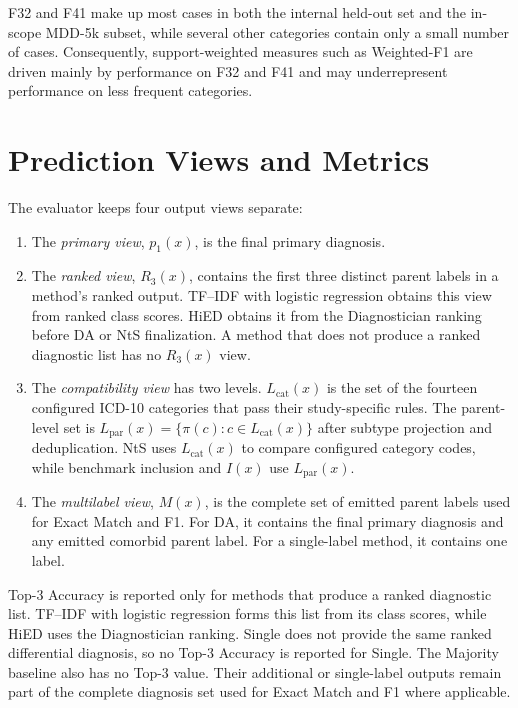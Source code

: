 \documentclass[12pt,a4paper,oneside]{report}
\begin{document}
F32 and F41 make up most cases in both the internal held-out set and the in-scope \mbox{MDD-5k} subset, while several other categories contain only a small number of cases. Consequently, support-weighted measures such as Weighted-F1 are driven mainly by performance on F32 and F41 and may underrepresent performance on less frequent categories.

\section{Prediction Views and Metrics}
\label{sec:prediction-metrics}

The evaluator keeps four output views separate:

\begin{enumerate}[label=(\arabic*)]
\item The \emph{primary view}, $p_1(x)$, is the final primary diagnosis.
\item The \emph{ranked view}, $R_3(x)$, contains the first three distinct parent labels in a method's ranked output. TF--IDF with logistic regression obtains this view from ranked class scores. HiED obtains it from the Diagnostician ranking before DA or NtS finalization. A method that does not produce a ranked diagnostic list has no $R_3(x)$ view.
\item The \emph{compatibility view} has two levels. $L_{\mathrm{cat}}(x)$ is the set of the fourteen configured ICD-10 categories that pass their study-specific rules. The parent-level set is $L_{\mathrm{par}}(x)=\{\pi(c):c\in L_{\mathrm{cat}}(x)\}$ after subtype projection and deduplication. NtS uses $L_{\mathrm{cat}}(x)$ to compare configured category codes, while benchmark inclusion and $I(x)$ use $L_{\mathrm{par}}(x)$.
\item The \emph{multilabel view}, $M(x)$, is the complete set of emitted parent labels used for Exact Match and F1. For DA, it contains the final primary diagnosis and any emitted comorbid parent label. For a single-label method, it contains one label.
\end{enumerate}

Top-3 Accuracy is reported only for methods that produce a ranked diagnostic list. TF--IDF with logistic regression forms this list from its class scores, while HiED uses the Diagnostician ranking. Single does not provide the same ranked differential diagnosis, so no Top-3 Accuracy is reported for Single. The Majority baseline also has no Top-3 value. Their additional or single-label outputs remain part of the complete diagnosis set used for Exact Match and F1 where applicable.
\end{document}
